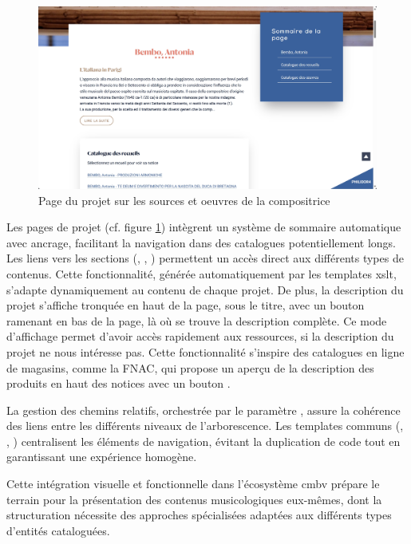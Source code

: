 \begin{figure}[h]
	\caption{Page du projet sur les sources et oeuvres de la compositrice } \label{page-projet-edition}
	\centering
	\includegraphics[width=\textwidth]{images/page-bembo-edition-philidor.png}
\end{figure}

Les pages de projet (cf. figure \ref{page-projet-edition}) intègrent un système de sommaire automatique avec ancrage, facilitant la navigation dans des catalogues potentiellement longs. Les liens vers les sections (, , ) permettent un accès direct aux différents types de contenus. Cette fonctionnalité, générée automatiquement par les templates \gls{xslt}, s'adapte dynamiquement au contenu de chaque projet. De plus, la description du projet s'affiche tronquée en haut de la page, sous le titre, avec un bouton ramenant en bas de la page, là où se trouve la description complète. Ce mode d'affichage permet d'avoir accès rapidement aux ressources, si la description du projet ne nous intéresse pas. Cette fonctionnalité s'inspire des catalogues en ligne de magasins, comme la FNAC, qui propose un aperçu de la description des produits en haut des notices avec un bouton .

La gestion des chemins relatifs, orchestrée par le paramètre , assure la cohérence des liens entre les différents niveaux de l'arborescence. Les templates communs (, , ) centralisent les éléments de navigation, évitant la duplication de code tout en garantissant une expérience homogène.

Cette intégration visuelle et fonctionnelle dans l'écosystème \gls{cmbv} prépare le terrain pour la présentation des contenus musicologiques eux-mêmes, dont la structuration nécessite des approches spécialisées adaptées aux différents types d'entités cataloguées.

